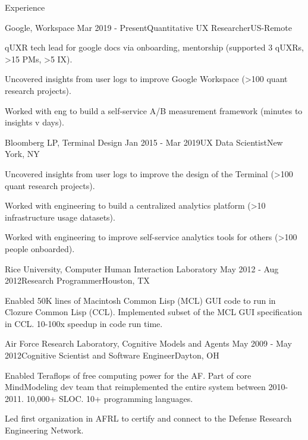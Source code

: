 
\begin{rSection}{Experience}

  \begin{rSubsection}{Google, Workspace}
    {Mar 2019 - Present}{Quantitative UX Researcher}{US-Remote}
  \item qUXR tech lead for google docs via onboarding, mentorship (supported 3 qUXRs, \textgreater15 PMs, \textgreater5 IX).
  \item Uncovered insights from user logs to improve Google Workspace (\textgreater100 quant research projects).
  \item Worked with eng to build a self-service A/B measurement framework (minutes to insights v days).
  \end{rSubsection}

  \begin{rSubsection}{Bloomberg LP, Terminal Design}
    {Jan 2015 - Mar 2019}{UX Data Scientist}{New York, NY}
    \item Uncovered insights from user logs to improve the design of the Terminal (\textgreater100 quant research projects).
    \item Worked with engineering to build a centralized analytics platform (\textgreater10 infrastructure usage datasets).
    \item Worked with engineering to improve self-service analytics tools for others (\textgreater100 people onboarded). 
  \end{rSubsection}

  \begin{rSubsection}{Rice University, Computer Human Interaction Laboratory}
    {May 2012 - Aug 2012}{Research Programmer}{Houston, TX}
  \item Enabled 50K lines of Macintosh Common Lisp (MCL) GUI code to run in Clozure Common Lisp (CCL).
    Implemented subset of the MCL GUI specification in CCL. 10-100x speedup in code run time. 
  \end{rSubsection}

  \begin{rSubsection}{Air Force Research Laboratory, Cognitive Models and Agents}
    {May 2009 - May 2012}{Cognitive Scientist and Software Engineer}{Dayton, OH}
  \item 
    Enabled Teraflops of free computing power for the AF.
    Part of core MindModeling dev team that reimplemented the entire system between 2010-2011.
    10,000+ SLOC. 10+ programming languages. 
  \item
    Led first organization in AFRL to certify and connect to the Defense Research Engineering Network.
  \end{rSubsection}


\end{rSection}
